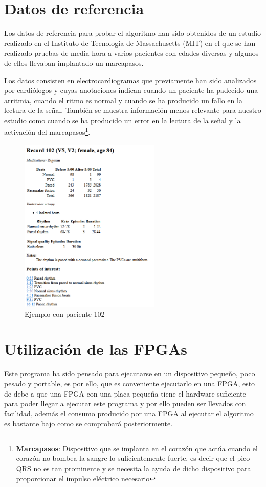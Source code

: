 \section{Datos de referencia}
Los datos de referencia para probar el algoritmo han sido obtenidos de un estudio realizado en el Instituto de Tecnología de Massachusetts (MIT) en el que se han realizado pruebas de media hora a varios pacientes con edades diversas y algunos de ellos llevaban implantado un marcapasos.

Los datos consisten en electrocardiogramas que previamente han sido analizados por cardiólogos y cuyas anotaciones indican cuando un paciente ha padecido una arritmia, cuando el ritmo es normal y cuando se ha producido un fallo en la lectura de la señal. También se muestra información menos relevante para nuestro 
estudio como cuando se ha producido un error en la lectura de la señal y la activación del marcapasos\footnote{\textbf{Marcapasos}: Dispositivo que se implanta en el corazón que actúa cuando el corazón no bombea la sangre lo suficientemente fuerte, es decir que el pico QRS no es tan prominente
y se necesita la ayuda de dicho dispositivo para proporcionar el impulso eléctrico necesario}.

\begin{figure}[h]
	\centering
	\includegraphics[width=0.6\textwidth]{./Images/img_introduccion/Paciente_pruebas_MIT.png}
	\caption{Ejemplo con paciente 102 \cite{mitdb}}
	\label{fig:Paciente_pruebas_MIT}
\end{figure}

\section{Utilización de las FPGAs}
Este programa ha sido pensado para ejecutarse en un dispositivo pequeño, poco pesado y portable, es por ello, que es conveniente ejecutarlo en una FPGA, esto de debe a que una FPGA con una placa pequeña tiene el hardware suficiente para poder llegar a ejecutar este programa y por ello pueden
ser llevados con facilidad, además el consumo producido por una FPGA al ejecutar el algoritmo es bastante bajo como se comprobará posteriormente.

